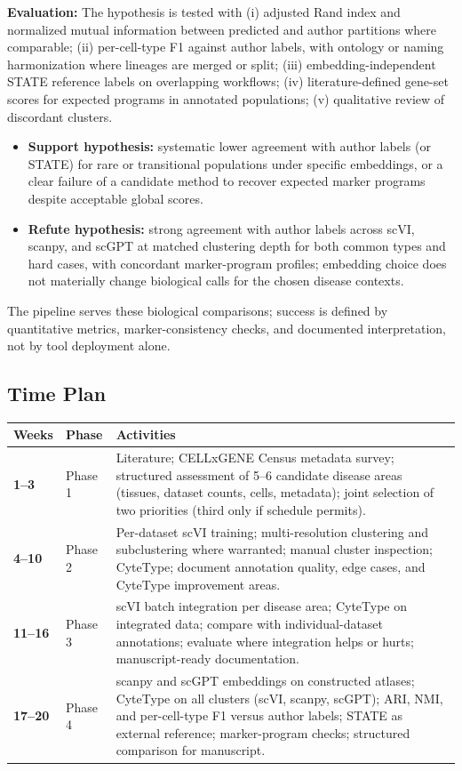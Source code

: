 \documentclass[12pt,a4paper]{article}
\begin{document}
\textbf{Evaluation:} The hypothesis is tested with (i) adjusted Rand index and normalized mutual information between predicted and author partitions where comparable; (ii) per-cell-type F1 against author labels, with ontology or naming harmonization where lineages are merged or split; (iii) embedding-independent STATE reference labels on overlapping workflows; (iv) literature-defined gene-set scores for expected programs in annotated populations; (v) qualitative review of discordant clusters.
\begin{itemize}
    \item \textbf{Support hypothesis:} systematic lower agreement with author labels (or STATE) for rare or transitional populations under specific embeddings, or a clear failure of a candidate method to recover expected marker programs despite acceptable global scores.
    \item \textbf{Refute hypothesis:} strong agreement with author labels across scVI, scanpy, and scGPT at matched clustering depth for both common types and hard cases, with concordant marker-program profiles; embedding choice does not materially change biological calls for the chosen disease contexts.
\end{itemize}
The pipeline serves these biological comparisons; success is defined by quantitative metrics, marker-consistency checks, and documented interpretation, not by tool deployment alone.

\subsection*{Time Plan}

\begin{table}[h!]
\centering
\begin{tabular}{>{\bfseries}p{1.5cm} p{1.8cm} p{10cm}}
\toprule
Weeks & Phase & Activities \\
\midrule
1–3  & Phase 1 & Literature; CELLxGENE Census metadata survey; structured assessment of 5–6 candidate disease areas (tissues, dataset counts, cells, metadata); joint selection of two priorities (third only if schedule permits). \\[6pt]
4–10 & Phase 2 & Per-dataset scVI training; multi-resolution clustering and subclustering where warranted; manual cluster inspection; CyteType; document annotation quality, edge cases, and CyteType improvement areas. \\[6pt]
11–16 & Phase 3 & scVI batch integration per disease area; CyteType on integrated data; compare with individual-dataset annotations; evaluate where integration helps or hurts; manuscript-ready documentation. \\[6pt]
17–20 & Phase 4 & scanpy and scGPT embeddings on constructed atlases; CyteType on all clusters (scVI, scanpy, scGPT); ARI, NMI, and per-cell-type F1 versus author labels; STATE as external reference; marker-program checks; structured comparison for manuscript. \\[6pt]
\bottomrule
\end{tabular}
\end{table}
\end{document}
